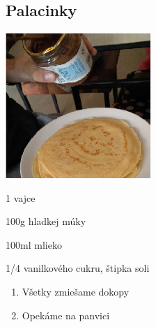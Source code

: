 \setcounter{step}{0}
\subsection{Palacinky}

\begin{ingredient}
\includegraphics[height=5.5cm]{images/palacinky}
\def\portions{1}%

\begin{main}
	\item 1 vajce
	\item 100g hladkej múky
	\item 100ml mlieko
	\item 1/4 vanilkového cukru, štipka soli
\end{main}
\end{ingredient}
\begin{recipe}

\begin{enumerate}


\item{Všetky zmiešame dokopy}
\item{Opekáme na panvici}

\end{enumerate}
\end{recipe}

\begin{notes}

\end{notes}
\clearpage	
